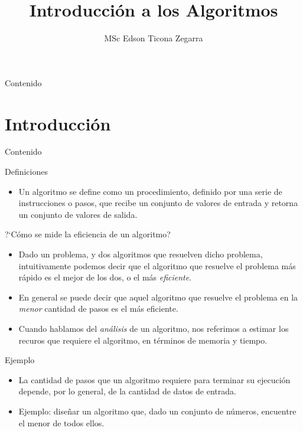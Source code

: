 \documentclass[handout]{beamer}
\title{Introducci\'on a los Algoritmos}
\author{MSc Edson Ticona Zegarra}
\institute{Campamento de Programaci\'on}
\date{}
\begin{document}
\maketitle

\begin{frame}{Contenido}
\tableofcontents
\end{frame}

\section{Introducci\'on}
\begin{frame}{Contenido}
\tableofcontents[currentsection]
\end{frame}

\begin{frame}{Definiciones}
\begin{itemize}
  \item Un algoritmo se define como un procedimiento, definido por una serie de instrucciones o pasos, que recibe un conjunto de valores de entrada y retorna un conjunto de valores de salida. 
\end{itemize}
\end{frame}

\begin{frame}{?`C\'omo se mide la eficiencia de un algoritmo?}
\begin{itemize}
  \item Dado un problema, y dos algoritmos que resuelven dicho problema, intuitivamente podemos decir que el algoritmo que resuelve el problema m\'as r\'apido es el mejor de los dos, o el m\'as \textit{eficiente}.
\pause
  \item En general se puede decir que aquel algoritmo que resuelve el problema en la \textit{menor} cantidad de pasos es el m\'as eficiente.
\pause
  \item Cuando hablamos del \textit{an\'alisis} de un algoritmo, nos referimos a estimar los recuros que requiere el algoritmo, en t\'erminos de memoria y tiempo.
\end{itemize}
\end{frame}

\begin{frame}{Ejemplo}
\begin{itemize}
  \item La cantidad de pasos que un algoritmo requiere para terminar su ejecuci\'on depende, por lo general, de la cantidad de datos de entrada.
\pause
  \item Ejemplo: dise\~nar un algoritmo que, dado un conjunto de n\'umeros, encuentre el menor de todos ellos.
\end{itemize}
\end{frame}
\end{document}
